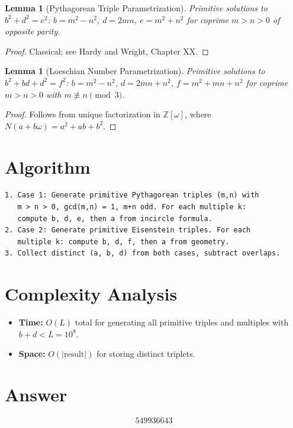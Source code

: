 \documentclass[12pt]{article}
\newtheorem{lemma}[theorem]{Lemma}
\begin{document}
\begin{lemma}[Pythagorean Triple Parametrization]
Primitive solutions to $b^2 + d^2 = e^2$: $b = m^2 - n^2$, $d = 2mn$, $e = m^2 + n^2$ for coprime $m > n > 0$ of opposite parity.
\end{lemma}

\begin{proof}
Classical; see Hardy and Wright, Chapter XX.
\end{proof}

\begin{lemma}[Loeschian Number Parametrization]
Primitive solutions to $b^2 + bd + d^2 = f^2$: $b = m^2 - n^2$, $d = 2mn + n^2$, $f = m^2 + mn + n^2$ for coprime $m > n > 0$ with $m \not\equiv n \pmod{3}$.
\end{lemma}

\begin{proof}
Follows from unique factorization in $\mathbb{Z}[\omega]$, where $N(a + b\omega) = a^2 + ab + b^2$.
\end{proof}

\section{Algorithm}

\begin{verbatim}
1. Case 1: Generate primitive Pythagorean triples (m,n) with
   m > n > 0, gcd(m,n) = 1, m+n odd. For each multiple k:
   compute b, d, e, then a from incircle formula.
2. Case 2: Generate primitive Eisenstein triples. For each
   multiple k: compute b, d, f, then a from geometry.
3. Collect distinct (a, b, d) from both cases, subtract overlaps.
\end{verbatim}

\section{Complexity Analysis}
\begin{itemize}
\item \textbf{Time:} $O(L)$ total for generating all primitive triples and multiples with $b + d < L = 10^8$.
\item \textbf{Space:} $O(|\text{result}|)$ for storing distinct triplets.
\end{itemize}

\section{Answer}

\[
\boxed{549936643}
\]
\end{document}
